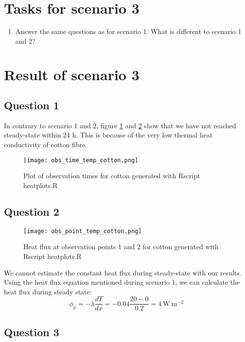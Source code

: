 \documentclass[
10pt, %
a4paper, %
oneside, %
headinclude,footinclude, %
BCOR5mm, %
]{scrartcl}
\begin{document}
\section*{Tasks for scenario 3}

\begin{enumerate}
\item Answer the same questions as for scenario 1. What is different to scenario 1 and 2?
\end{enumerate}

\section*{Result of scenario 3}
\subsection*{Question 1}
In contrary to scenario 1 and 2, figure \ref{plot7} and \ref{plot8} show that we have not reached steady-state within 24 h. This is because of the very low thermal heat conductivity of cotton fibre. 

\begin{figure}[!h]
\centering
\texttt{[image: obs\_time\_temp\_cotton.png]}
\caption{\label{plot7}Plot of observation times for cotton generated with Rscript heatplots.R}
\end{figure}

\subsection*{Question 2}

\begin{figure}[!h]
\centering
\texttt{[image: obs\_point\_temp\_cotton.png]}
\caption{\label{plot8} Heat flux at observation points 1 and 2 for cotton generated with Rscript heatplots.R}
\end{figure}

We cannot estimate the constant heat flux during steady-state with our results. Using the heat flux equation mentioned during scenario 1, we can calculate the heat flux during steady state:
\begin{equation*}
\phi_{\mathrm{p}}=-\lambda\frac{dT}{dx}= -0.04 \frac{20-0}{0.2}= 4 \mathrm{~W~m^{-2}}
\end{equation*}

\subsection*{Question 3}
\end{document}

